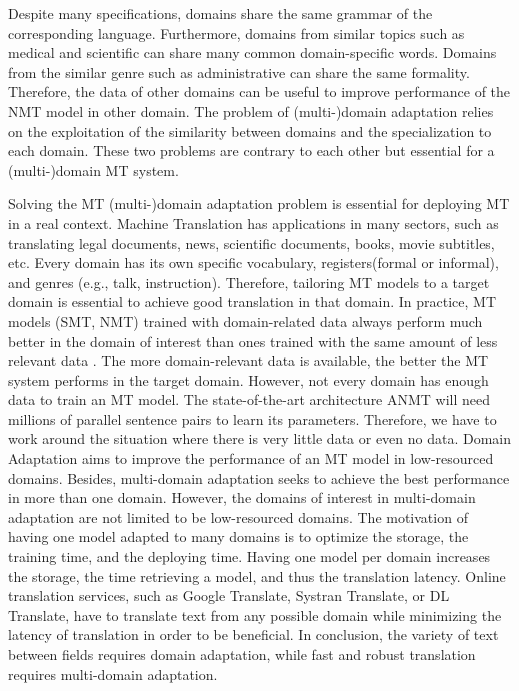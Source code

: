 Despite many specifications, domains share the same grammar of the corresponding language. Furthermore, domains from similar topics such as medical and scientific can share many common domain-specific words. Domains from the similar genre such as administrative can share the same formality. Therefore, the data of other domains can be useful to improve performance of the NMT model in other domain. The problem of (multi-)domain adaptation relies on the exploitation of the similarity between domains and the specialization to each domain. These two problems are contrary to each other but essential for a (multi-)domain MT system.

Solving the MT (multi-)domain adaptation problem is essential for deploying MT in a real context. Machine Translation has applications in many sectors, such as translating legal documents, news, scientific documents, books, movie subtitles, etc. Every domain has its own specific vocabulary, registers(formal or informal), and genres (e.g., talk, instruction). Therefore, tailoring MT models to a target domain is essential to achieve good translation in that domain. In practice, MT models (SMT, NMT) trained with domain-related data always perform much better in the domain of interest than ones trained with the same amount of less relevant data \citep{Rico13domain, Saunders21Domain}. The more domain-relevant data is available, the better the MT system performs in the target domain. However, not every domain has enough data to train an MT model. The state-of-the-art architecture ANMT will need millions of parallel sentence pairs to learn its parameters. Therefore, we have to work around the situation where there is very little data or even no data. Domain Adaptation aims to improve the performance of an MT model in low-resourced domains. Besides, multi-domain adaptation seeks to achieve the best performance in more than one domain. However, the domains of interest in multi-domain adaptation are not limited to be low-resourced domains. The motivation of having one model adapted to many domains is to optimize the storage, the training time, and the deploying time. Having one model per domain increases the storage, the time retrieving a model, and thus the translation latency. Online translation services, such as Google Translate, Systran Translate, or DL Translate, have to translate text from any possible domain while minimizing the latency of translation in order to be beneficial. In conclusion, the variety of text between fields requires domain adaptation, while fast and robust translation requires multi-domain adaptation.

